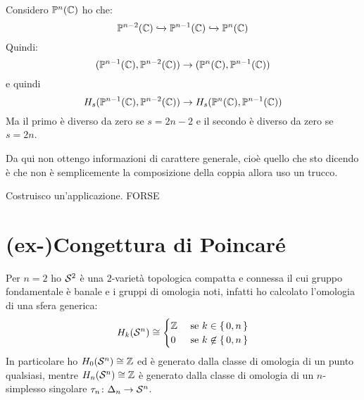 Considero $ \mathbb{P}^{n} (\mathbb{C}) $ ho che:
\[
  \mathbb{P}^{n-2} (\mathbb{C}) \xhookrightarrow{} \mathbb{P}^{n-1} (\mathbb{C}) \xhookrightarrow{} \mathbb{P}^{n} (\mathbb{C})
\]
Quindi:
\[
  (\mathbb{P}^{n-1} (\mathbb{C}), \mathbb{P}^{n-2} (\mathbb{C})) \to (\mathbb{P}^{n} (\mathbb{C}), \mathbb{P}^{n-1} (\mathbb{C}))
\]
e quindi
\[
  H_s(\mathbb{P}^{n-1} (\mathbb{C}), \mathbb{P}^{n-2} (\mathbb{C})) \to H_s(\mathbb{P}^{n} (\mathbb{C}), \mathbb{P}^{n-1} (\mathbb{C}))
\]
Ma il primo è diverso da zero se $ s = 2n - 2 $ e
il secondo è diverso da zero se $ s = 2n $.

Da qui non ottengo informazioni di carattere generale,
cioè quello che sto dicendo è che non è semplicemente
la composizione della coppia allora uso un trucco.

Costruisco un'applicazione. FORSE



\section{(ex-)Congettura di Poincaré}

Per $ n = 2 $ ho $ \mathcal{S}^{2} $ è una $ 2 $-varietà topologica compatta e connessa
il cui gruppo fondamentale è banale e i gruppi di omologia noti, infatti ho
calcolato l'omologia di una sfera generica:
\[
  H_k(\mathcal{S}^{n}) \cong
  \begin{cases}
    \mathbb{Z} & \text{ se } k \in \set{0,n} \\
    0 & \text{ se } k \not \in \set{0,n}
  \end{cases}
\]
In particolare ho $ H_0(\mathcal{S}^{n}) \cong \mathbb{Z} $ ed è generato dalla classe di
omologia di un punto qualsiasi, mentre $ H_n(\mathcal{S}^{n}) \cong \mathbb{Z} $ è generato dalla
classe di omologia di un $ n $-simplesso singolare $ \tau_n \colon \Delta_n \to \mathcal{S}^{n} $.

